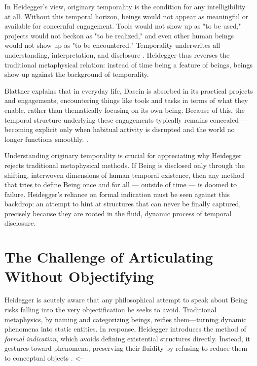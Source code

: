 \documentclass{article}
\begin{document}
In Heidegger's view, originary temporality is the condition for any intelligibility at all. Without this temporal horizon, beings would not appear as meaningful or available for concernful engagement. Tools would not show up as "to be used," projects would not beckon as "to be realized," and even other human beings would not show up as "to be encountered." Temporality underwrites all understanding, interpretation, and disclosure \parencite[pp.~645--650]{heidegger1962}. Heidegger thus reverses the traditional metaphysical relation: instead of time being a feature of beings, beings show up against the background of temporality.

Blattner explains that in everyday life, Dasein is absorbed in its practical projects and engagements, encountering things like tools and tasks in terms of what they enable, rather than thematically focusing on its own being. Because of this, the temporal structure underlying these engagements typically remains concealed—becoming explicit only when habitual activity is disrupted and the world no longer functions smoothly. \parencite[p.~314]{blattner2007}.

Understanding originary temporality is crucial for appreciating why Heidegger rejects traditional metaphysical methods. If Being is disclosed only through the shifting, interwoven dimensions of human temporal existence, then any method that tries to define Being once and for all --- outside of time --- is doomed to failure. Heidegger's reliance on formal indication must be seen against this backdrop: an attempt to hint at structures that can never be finally captured, precisely because they are rooted in the fluid, dynamic process of temporal disclosure.

\section*{The Challenge of Articulating \\ Without Objectifying}

Heidegger is acutely aware that any philosophical attempt to speak about Being risks falling into the very objectification he seeks to avoid. Traditional metaphysics, by naming and categorizing beings, reifies them—turning dynamic phenomena into static entities. In response, Heidegger introduces the method of \textit{formal indication}, which avoids defining existential structures directly. Instead, it gestures toward phenomena, preserving their fluidity by refusing to reduce them to conceptual objects \parencite[pp.~781–784]{dahlstrom1994}. <-
\end{document}

